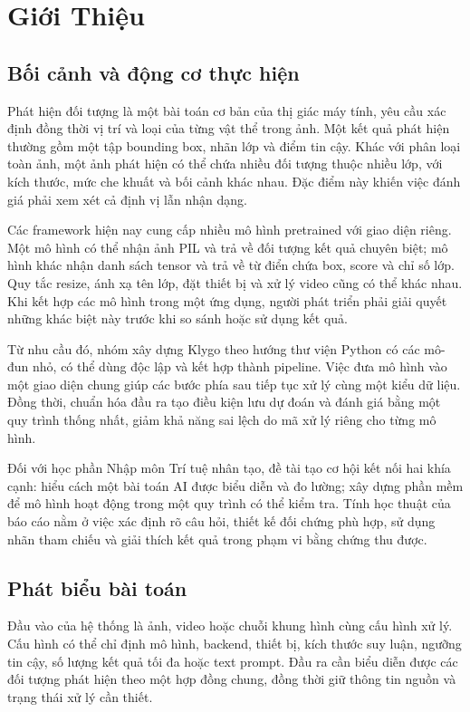 \chapter{Giới Thiệu}
\label{chap:intro}
\section{Bối cảnh và động cơ thực hiện}
Phát hiện đối tượng là một bài toán cơ bản của thị giác máy tính, yêu cầu xác định đồng thời vị trí và loại của từng vật thể trong ảnh. Một kết quả phát hiện thường gồm một tập bounding box, nhãn lớp và điểm tin cậy. Khác với phân loại toàn ảnh, một ảnh phát hiện có thể chứa nhiều đối tượng thuộc nhiều lớp, với kích thước, mức che khuất và bối cảnh khác nhau. Đặc điểm này khiến việc đánh giá phải xem xét cả định vị lẫn nhận dạng.

Các framework hiện nay cung cấp nhiều mô hình pretrained với giao diện riêng. Một mô hình có thể nhận ảnh PIL và trả về đối tượng kết quả chuyên biệt; mô hình khác nhận danh sách tensor và trả về từ điển chứa box, score và chỉ số lớp. Quy tắc resize, ánh xạ tên lớp, đặt thiết bị và xử lý video cũng có thể khác nhau. Khi kết hợp các mô hình trong một ứng dụng, người phát triển phải giải quyết những khác biệt này trước khi so sánh hoặc sử dụng kết quả.

Từ nhu cầu đó, nhóm xây dựng Klygo theo hướng thư viện Python có các mô-đun nhỏ, có thể dùng độc lập và kết hợp thành pipeline. Việc đưa mô hình vào một giao diện chung giúp các bước phía sau tiếp tục xử lý cùng một kiểu dữ liệu. Đồng thời, chuẩn hóa đầu ra tạo điều kiện lưu dự đoán và đánh giá bằng một quy trình thống nhất, giảm khả năng sai lệch do mã xử lý riêng cho từng mô hình.

Đối với học phần Nhập môn Trí tuệ nhân tạo, đề tài tạo cơ hội kết nối hai khía cạnh: hiểu cách một bài toán AI được biểu diễn và đo lường; xây dựng phần mềm để mô hình hoạt động trong một quy trình có thể kiểm tra. Tính học thuật của báo cáo nằm ở việc xác định rõ câu hỏi, thiết kế đối chứng phù hợp, sử dụng nhãn tham chiếu và giải thích kết quả trong phạm vi bằng chứng thu được.

\section{Phát biểu bài toán}
Đầu vào của hệ thống là ảnh, video hoặc chuỗi khung hình cùng cấu hình xử lý. Cấu hình có thể chỉ định mô hình, backend, thiết bị, kích thước suy luận, ngưỡng tin cậy, số lượng kết quả tối đa hoặc text prompt. Đầu ra cần biểu diễn được các đối tượng phát hiện theo một hợp đồng chung, đồng thời giữ thông tin nguồn và trạng thái xử lý cần thiết.

